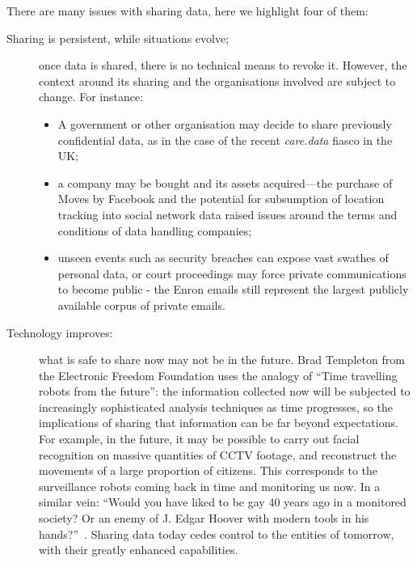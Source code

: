 \documentclass{IOS-Book-Article}     %
\begin{document}
There are many issues with sharing data, here we highlight four of them:
\begin{description}
  \item[Sharing is persistent, while situations evolve;] once data is shared,
  there is no technical means to revoke it. However, the context around its sharing and the
  organisations involved are subject to change. For instance:
  \begin{itemize}
    \item A government or other organisation may decide to share previously
    confidential data, as in the case of the recent \emph{care.data} fiasco in the UK;
    \item a company may be bought and its assets acquired---the purchase
    of Moves by Facebook and the potential for subsumption of location tracking
    into social network data raised issues around the terms and conditions of
    data handling companies;
    \item unseen events such as security breaches can expose vast
    swathes of personal data, or court proceedings may force private 
    communications to become public - the Enron emails still
    represent the largest publicly available corpus of private emails. 
  \end{itemize}


\item[Technology improves:] what is safe to share now may not be in the
future. Brad Templeton from the Electronic Freedom Foundation uses the analogy
of ``Time travelling robots from the future'': the information collected now
will be subjected to increasingly sophisticated analysis techniques as time
progresses, so the implications of sharing that information can be far beyond
expectations. For example, in the future, it may be possible to carry out facial
recognition on massive quantities of CCTV footage, and reconstruct the movements
of a large proportion of citizens. This corresponds to the surveillance
robots coming back in time and monitoring us now. In a similar vein: ``Would
you have liked to be gay 40 years ago in a monitored society? Or an enemy of J.
Edgar Hoover with modern tools in his hands?''~\cite{templetonWatched}. Sharing
data today cedes control to the entities of tomorrow, with their greatly
enhanced capabilities.


\end{description}
\end{document}
